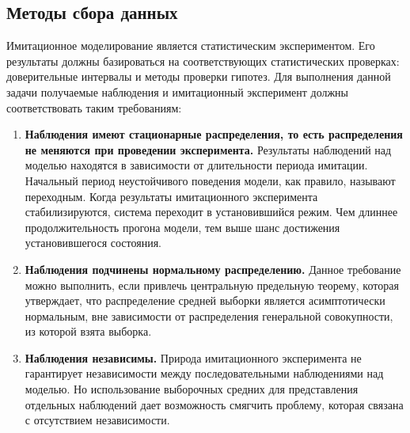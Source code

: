 \subsection{Методы сбора данных}

Имитационное моделирование является статистическим экспериментом.
Его результаты должны базироваться на соответствующих статистических проверках: доверительные интервалы и методы проверки гипотез.
Для выполнения данной задачи получаемые наблюдения и имитационный эксперимент должны соответствовать таким требованиям:

\begin{enumerate}
\tightlist
\item
  \textbf{Наблюдения имеют стационарные распределения, то есть распределения не  меняются при проведении эксперимента.}
  Результаты наблюдений над моделью находятся в зависимости от длительности периода имитации.
  Начальный период неустойчивого поведения модели, как правило, называют переходным. 
  Когда результаты имитационного эксперимента стабилизируются, система переходит в установившийся режим.
  Чем длиннее продолжительность прогона модели, тем выше шанс достижения установившегося состояния.
\item
  \textbf{Наблюдения подчинены нормальному распределению.}
Данное требование можно выполнить, если привлечь центральную предельную
теорему, которая утверждает, что распределение средней выборки является
асимптотически нормальным, вне зависимости от распределения генеральной
совокупности, из которой взята выборка.

\item
  \textbf{Наблюдения независимы.}
Природа имитационного эксперимента не гарантирует независимости между
последовательными наблюдениями над моделью. 
Но использование выборочных средних для представления отдельных наблюдений дает возможность смягчить
проблему, которая связана с отсутствием независимости.
\end{enumerate}

